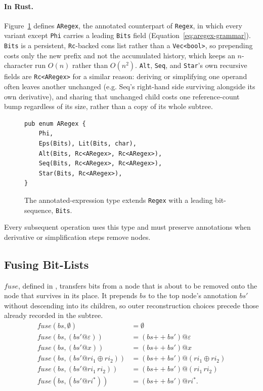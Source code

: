 \paragraph{In Rust.}
\label{sec:aregex-type}
Figure~\ref{fig:aregex-enum} defines \texttt{ARegex}, 
the annotated counterpart of \texttt{Regex}, 
in which every variant except \texttt{Phi} carries a leading \texttt{Bits} field
(Equation~\eqref{eq:aregex-grammar}). 
\texttt{Bits} is a persistent,
\texttt{Rc}-backed cons list rather than a \texttt{Vec<bool>},
so prepending costs only the new prefix and not the accumulated history,
which keeps an $n$-character run $O(n)$ rather than $O(n^2)$.
\texttt{Alt}, \texttt{Seq}, and \texttt{Star}'s own recursive fields are
\texttt{Rc<ARegex>} for a similar reason: deriving or simplifying one
operand often leaves another unchanged (e.g. Seq's right-hand side
surviving alongside its own derivative), and sharing
that unchanged child costs one reference-count bump regardless of its
size, rather than a copy of its whole subtree.
\begin{figure}[H]
\small
\begin{verbatim}
pub enum ARegex {
    Phi,
    Eps(Bits), Lit(Bits, char),
    Alt(Bits, Rc<ARegex>, Rc<ARegex>),
    Seq(Bits, Rc<ARegex>, Rc<ARegex>),
    Star(Bits, Rc<ARegex>),
}
\end{verbatim}
\caption{The annotated-expression type extends \texttt{Regex} with a leading
bit-sequence, \texttt{Bits}.}
\label{fig:aregex-enum}
\end{figure}

Every subsequent operation uses this type 
and must preserve annotations when derivative or simplification steps remove nodes. 

%
%
%

\clearpage
\subsection{Fusing Bit-Lists}
\label{sec:fuse}
$\mathit{fuse}$, defined in \citep[Fig.~5]{sulzmannlu2014}, 
transfers bits from a node that is about to be removed 
onto the node that survives in its place. 
It prepends $bs$ to the top node's annotation $bs'$ 
without descending into its children, 
so outer reconstruction choices precede those 
already recorded in the subtree.
\begin{equation}\label{eq:fuse}
\begin{aligned}
\mathit{fuse}(bs, \emptyset) &= \emptyset \\
\mathit{fuse}(bs, (bs'@\varepsilon)) &= (bs \mathbin{+\!\!+} bs')@\varepsilon \\
\mathit{fuse}(bs, (bs'@x)) &= (bs \mathbin{+\!\!+} bs')@x \\
\mathit{fuse}(bs, (bs'@\mathit{ri}_1 \oplus \mathit{ri}_2))
  &= (bs \mathbin{+\!\!+} bs')@(\mathit{ri}_1 \oplus \mathit{ri}_2) \\
\mathit{fuse}(bs, (bs'@\mathit{ri}_1\,\mathit{ri}_2))
  &= (bs \mathbin{+\!\!+} bs')@(\mathit{ri}_1\,\mathit{ri}_2) \\
\mathit{fuse}(bs, (bs'@\mathit{ri}^{*}))
  &= (bs \mathbin{+\!\!+} bs')@\mathit{ri}^{*}.
\end{aligned}
\end{equation}

